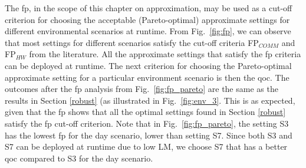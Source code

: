 The \gls{fp}, in the scope of this chapter on approximation, may be used as a cut-off criterion for choosing the acceptable (Pareto-optimal) approximate settings for different environmental scenarios at runtime. From Fig.\ \ref{fig:fp}, we can observe that most settings for different scenarios satisfy the cut-off criteria FP$_{COMM}$ and FP$_{HW}$ from the literature.
All the approximate settings that satisfy the \gls{fp} criteria can be deployed at runtime. The next criterion for choosing the Pareto-optimal approximate setting for a particular environment scenario is then the \gls{qoc}.
The outcomes after the \gls{fp} analysis from Fig.\ \ref{fig:fp_pareto} are the same as the results in Section \ref{robust} (as illustrated in Fig.\ \ref{fig:env_3}. This is as expected, given that the \gls{fp} shows that all the optimal settings found in Section \ref{robust} satisfy the \gls{fp} cut-off criterion. Note that in Fig.\ \ref{fig:fp_pareto}, the setting S3 has the lowest \gls{fp} for the day scenario, lower than setting S7. Since both S3 and S7 can be deployed at runtime due to low LM, we choose S7 that has a better \gls{qoc} compared to S3 for the day scenario.